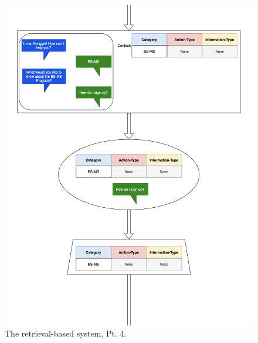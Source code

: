 \documentclass[titlepage, 12pt]{article}
\begin{document}
\begin{figure}[p]
    \centering\includegraphics[width=1\linewidth]{images/retrieval-4.png}
    \caption{The retrieval-based system, Pt. 4.}
\end{figure}
\end{document}
